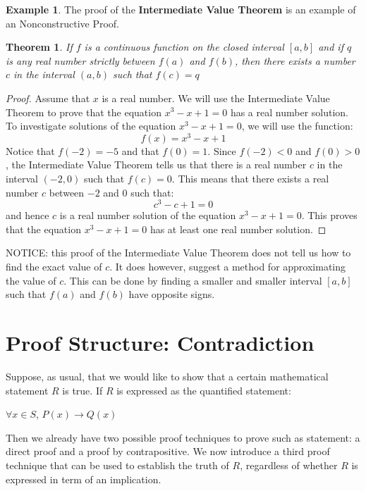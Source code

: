 \documentclass{book}
\newtheorem{theorem}{Theorem}[section]
\theoremstyle{definition}
\newtheorem{example}{Example}[definition]
\theoremstyle{remark}
\begin{document}
\begin{example}
The proof of the {\bf Intermediate Value Theorem} is an example of an Nonconstructive Proof.

\begin{tcolorbox}
	\begin{theorem}
		If $f$ is a continuous function on the closed interval $[a,b]$ and if $q$ is any real number strictly between $f(a)$ and $f(b)$, then there exists a number $c$ in the interval $(a,b)$ such that $f(c) = q$
	\end{theorem}
\end{tcolorbox}

\begin{proof}
Assume that $x$ is a real number. We will use the Intermediate Value Theorem to prove that the equation $x^3 - x + 1 = 0$ has a real number solution. \\
To investigate solutions of the equation $x^3 - x + 1 = 0$, we will use the function: 
	\begin{equation}
		f(x) = x^3 - x + 1 \nonumber
	\end{equation}
Notice that $f(-2) = - 5$ and that $f(0) = 1$. Since $f(-2) < 0$ and $f(0) > 0$, the Intermediate Value Theorem tells us that there is a real number $c$ in the interval $(-2, 0)$ such that $f(c) = 0$. This means that there exists a real number $c$ between $-2$ and $0$ such that: 
	\begin{equation}
		c^3 - c + 1 = 0 \nonumber
	\end{equation}
and hence $c$ is a real number solution of the equation $x^3 - x  + 1 = 0$. This proves that the equation $x^3 - x + 1 = 0$ has at least one real number solution. 
\end{proof}

NOTICE: this proof of the Intermediate Value Theorem does not tell us how to find the exact value of $c$. It does however, suggest a method for approximating the value of $c$. This can be done by finding a smaller and smaller interval $[a, b]$ such that $f(a)$ and $f(b)$ have opposite signs. 
\end{example}









\newpage
\section{Proof Structure: Contradiction}
Suppose, as usual, that we would like to show that a certain mathematical statement $R$ is true. If $R$ is expressed as the quantified statement: 
	\begin{center}
 		$\forall x \in S$, $P(x) \to Q(x)$
	\end{center}	  
Then we already have two possible proof techniques to prove such as statement: a direct proof and a proof by contrapositive. We now introduce a third proof technique that can be used to establish the truth of $R$, regardless of whether $R$ is expressed in term of an implication. \\ 
\end{document}
